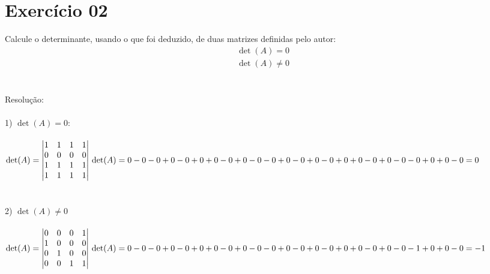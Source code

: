\documentclass{report}
\begin{document}
\section{Exercício 02}
Calcule o determinante, usando o que foi deduzido, de duas matrizes definidas pelo autor: \\
\begin{align*}
\det(A)=0 \\
\det(A) \neq 0
\end{align*} \\\\
Resolução: \\\\
1) $\det(A)=0$: \\\\
$\det(A) = 
\begin{vmatrix}
1 & 1 & 1 & 1 \\ 
0 & 0 & 0 & 0 \\ 
1 & 1 & 1 & 1 \\ 
1 & 1 & 1 & 1
\end{vmatrix}\\\\
\det(A)=0 - 0 - 0 + 0 - 0 + 0 + 0 - 0 + 0 - 0 - 0 + 0 - 0 + 0 - 0 + 0 + 0 - 0 + 0 - 0 - 0 + 0 + 0 - 0 = 0 $\\\\\\
2) $\det(A) \neq 0$ \\\\
$\det(A) = 
\begin{vmatrix}
0 & 0 & 0 & 1 \\ 
1 & 0 & 0 & 0 \\ 
0 & 1 & 0 & 0 \\ 
0 & 0 & 1 & 1
\end{vmatrix}\\\\ 
\det(A)= 0 - 0 - 0 + 0 - 0 + 0 + 0 - 0 + 0 - 0 - 0 + 0 - 0 + 0 - 0 + 0 + 0 - 0 + 0 - 0 - 1 + 0 + 0 - 0 = -1
$
\end{document}
